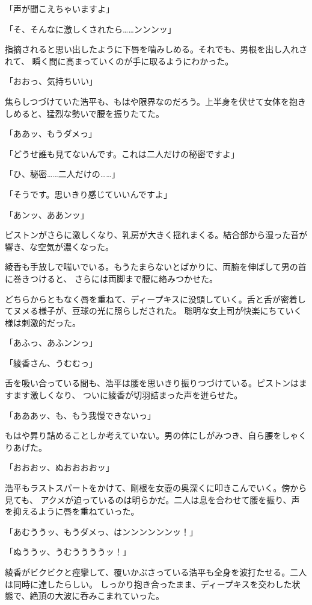 ﻿\documentclass[
    book,tate,
    line_length=30zw,
    jafontsize=12pt,
    paper=b5j,
    landscape,
    ]{jlreq}
\begin{document}
「声が聞こえちゃいますよ」

「そ、そんなに激しくされたら……ンンンッ」

指摘されると思い出したように下唇を噛みしめる。それでも、男根を出し入れされて、
瞬く間に高まっていくのが手に取るようにわかった。

「おおっ、気持ちいい」

焦らしつづけていた浩平も、もはや限界なのだろう。上半身を伏せて女体を抱きしめると、猛烈な勢いで腰を振りたてた。

「ああッ、もうダメっ」

「どうせ誰も見てないんです。これは二人だけの秘密ですよ」

「ひ、秘密……二人だけの……」

「そうです。思いきり感じていいんですよ」

「あンッ、ああンッ」

ピストンがさらに激しくなり、乳房が大きく揺れまくる。結合部から湿った音が響き、な空気が濃くなった。

綾香も手放しで喘いでいる。もうたまらないとばかりに、両腕を伸ばして男の首に巻きつけると、
さらには両脚まで腰に絡みつかせた。

どちらからともなく唇を重ねて、ディープキスに没頭していく。舌と舌が密着してヌメる様子が、豆球の光に照らしだされた。
聡明な女上司が快楽にちていく様は刺激的だった。

「あふっ、あふンンっ」

「綾香さん、うむむっ」

舌を吸い合っている間も、浩平は腰を思いきり振りつづけている。ピストンはますます激しくなり、
ついに綾香が切羽詰まった声を迸らせた。

「あああッ、も、もう我慢できないっ」

もはや昇り詰めることしか考えていない。男の体にしがみつき、自ら腰をしゃくりあげた。

「おおおッ、ぬおおおおッ」

浩平もラストスパートをかけて、剛根を女壺の奥深くに叩きこんでいく。傍から見ても、
アクメが迫っているのは明らかだ。二人は息を合わせて腰を振り、声を抑えるように唇を重ねていった。

「あむううッ、もうダメっ、はンンンンンンッ！」

「ぬううッ、うむううううッ！」

綾香がビクビクと痙攣して、覆いかぶさっている浩平も全身を波打たせる。二人は同時に達したらしい。
しっかり抱き合ったまま、ディープキスを交わした状態で、絶頂の大波に呑みこまれていった。
\end{document}
